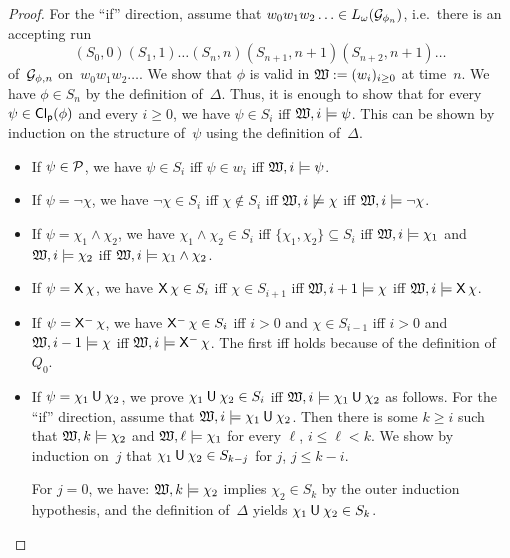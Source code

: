 \begin{proof}
    For the \enquote{if} direction, assume that
    $w_0w_1w_2\dotso\in L_\omega(\mathcal{G}_{\phi_n})$, i.e.~there is an accepting run
    \[(S_0,0)(S_1,1)\dots(S_n,n)(S_{n+1},n+1)(S_{n+2},n+1)\dots\]
    of~$\mathcal{G}_{\phi,n}$ on~$w_0w_1w_2\dots$.
    We show that $\phi$ is valid in $\mathfrak{W}:=(w_i)_{i\ge 0}$ at time~$n$.  We have
    $\phi\in S_n$ by the definition of~$\Delta$.  Thus, it is enough to show
    that for every $\psi\in\operatorname{\mathsf{Cl_p}}(\phi)$ and every $i\ge 0$, we have $\psi\in S_i$
    iff $\mathfrak{W},i\models\psi$.  This can be shown by induction on the structure
    of~$\psi$ using the definition of~$\Delta$.
    \begin{itemize}
        \item If $\psi\in\mathcal{P}$, we have $\psi\in S_i$ iff $\psi\in w_i$ iff
            $\mathfrak{W},i\models\psi$.
        \item If $\psi=\lnot\chi$, we have $\lnot\chi\in S_i$ iff
            $\chi\notin S_i$ iff $\mathfrak{W},i\not\models\chi$ iff
            $\mathfrak{W},i\models\lnot\chi$.
        \item If $\psi=\chi_1\land\chi_2$, we have $\chi_1\land\chi_2\in S_i$
            iff $\{\chi_1,\chi_2\}\subseteq S_i$ iff $\mathfrak{W},i\models\chi_1$ and
            $\mathfrak{W},i\models\chi_2$ iff $\mathfrak{W},i\models\chi_1\land\chi_2$.
        \item If $\psi=\operatorname{\mathsf{X}}\chi$, we have $\operatorname{\mathsf{X}}\chi\in S_i$ iff
            $\chi\in S_{i+1}$ iff $\mathfrak{W},i+1\models\chi$ iff
            $\mathfrak{W},i\models\operatorname{\mathsf{X}}\chi$.
        \item If $\psi=\Previous\chi$, we have $\Previous\chi\in S_i$ iff $i>0$
            and $\chi\in S_{i-1}$ iff $i>0$ and $\mathfrak{W},i-1\models\chi$ iff
            $\Wmf,i\models\Previous\chi$.  The first iff holds because of the
            definition of $Q_0$.
        \item If $\psi=\chi_1\mathbin{\mathsf{U}}\chi_2$, we prove $\chi_1\mathbin{\mathsf{U}}\chi_2\in S_i$
            iff $\mathfrak{W},i\models\chi_1\mathbin{\mathsf{U}}\chi_2$ as follows.
            For the \enquote{if} direction, assume that
            $\mathfrak{W},i\models\chi_1\mathbin{\mathsf{U}}\chi_2$. Then there is some $k\ge i$ such
            that $\mathfrak{W},k\models\chi_2$ and $\mathfrak{W},\ell\models\chi_1$ for every
            $\ell$, $i\le\ell<k$.  We show by induction on~$j$ that
            $\chi_1\mathbin{\mathsf{U}}\chi_2\in S_{k-j}$ for $j$, $j\le k-i$.

            For $j=0$, we have: $\mathfrak{W},k\models\chi_2$ implies $\chi_2\in S_k$ by
            the outer induction hypothesis, and the definition of~$\Delta$
            yields $\chi_1\mathbin{\mathsf{U}}\chi_2\in S_k$.


\end{itemize}
\end{proof}
